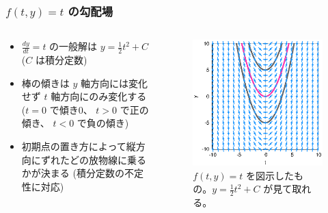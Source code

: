 \documentclass[dvipdfmx,aspectratio=169,20pt]{beamer}
\newcommand{\myfontsetting}[3]{{\fontsize{#1}{#2}\selectfont #3}}
\begin{document}
\begin{frame}
\frametitle{\myfontsetting{28pt}{28pt}{[図解] $f(t,y) = t$ の勾配場}}
\begin{columns}[t]
\begin{column}{0.48\textwidth} 
\vspace{-8mm}
\begin{itemize}
    \item 
    \myfontsetting{12pt}{12pt}{
    $\frac{dy}{dt} = t$ の一般解は $y=\frac{1}{2}t^2+C$ \myfontsetting{10pt}{10pt}{($C$ は積分定数)}
    }
    \vspace{-1mm}
    \item 
    \myfontsetting{12pt}{12pt}{
    棒の傾きは $y$ 軸方向には変化せず $t$ 軸方向にのみ変化する
    }\\
    \vspace{-2mm}
    \myfontsetting{6pt}{6pt}{
    ($t=0$ で傾き0、 $t>0$ で正の傾き、 $t<0$ で負の傾き)
    }
    \vspace{-1mm}
    \item \myfontsetting{12pt}{12pt}{
        初期点の置き方によって縦方向にずれたどの放物線に乗るかが決まる
        \myfontsetting{10pt}{10pt}{(積分定数の不定性に対応)}
        }
\end{itemize}
\end{column}

\begin{column}{0.52\textwidth} 
\begin{figure}[h]
	\begin{center}
\vspace{-10mm}
    	\includegraphics[width=1.0\textwidth]{fig12-3_differential_equation_t.eps}
	\end{center}
	\vspace{-5mm}
	\caption{\myfontsetting{10pt}{10pt}{$f(t,y)=t$ を図示したもの。$y=\frac{1}{2}t^2+C$ が見て取れる。}}
\end{figure}
\end{column}
\end{columns}
\end{frame}
\end{document}
